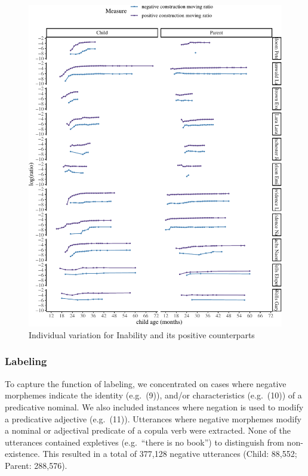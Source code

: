 \documentclass[
  english,
  man,floatsintext]{apa6}
\begin{document}
\begin{figure}[H]

{\centering \includegraphics{neg_construction_article_files/figure-latex/individualinability-1} 

}

\caption{Individual variation for Inability and its positive counterparts}\label{fig:individualinability}
\end{figure}

\clearpage

\hypertarget{labeling}{%
\subsubsection{Labeling}\label{labeling}}

To capture the function of labeling, we concentrated on cases where negative morphemes indicate the identity (e.g.~(9)), and/or characteristics (e.g.~(10)) of a predicative nominal. We also included instances where negation is used to modify a predicative adjective (e.g.~(11)). Utterances where negative morphemes modify a nominal or adjectival predicate of a copula verb were extracted. None of the utterances contained expletives (e.g.~\enquote{there is no book}) to distinguish from non-existence. This resulted in a total of 377,128 negative utterances (Child: 88,552; Parent: 288,576).
\end{document}
